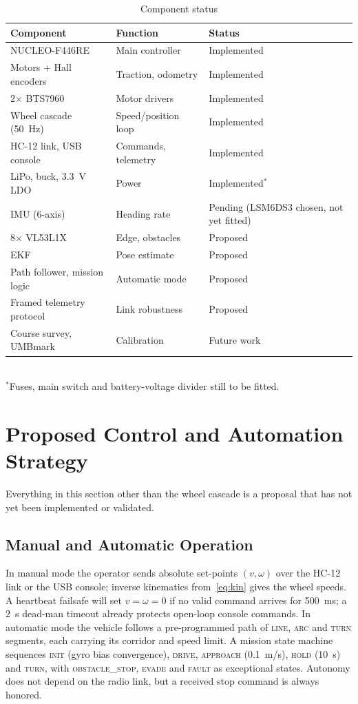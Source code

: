 \documentclass[conference]{IEEEtran}\newcommand{\haveieee}{}%
\begin{document}
\begin{table}[!t]
\caption{Component status}
\label{tab:status}
\centering\footnotesize
\setlength{\tabcolsep}{3pt}
\begin{tabular}{@{}p{3.1cm}p{2.7cm}p{1.5cm}@{}}
\toprule
\textbf{Component} & \textbf{Function} & \textbf{Status}\\
\midrule
NUCLEO-F446RE & Main controller & Implemented\\
Motors + Hall encoders & Traction, odometry & Implemented\\
2$\times$ BTS7960 & Motor drivers & Implemented\\
Wheel cascade (50~Hz) & Speed/position loop & Implemented\\
HC-12 link, USB console & Commands, telemetry & Implemented\\
LiPo, buck, 3.3~V LDO & Power & Implemented$^{*}$\\
IMU (6-axis) & Heading rate & Pending (LSM6DS3 chosen, not yet fitted)\\
8$\times$ VL53L1X & Edge, obstacles & Proposed\\
EKF & Pose estimate & Proposed\\
Path follower, mission logic & Automatic mode & Proposed\\
Framed telemetry protocol & Link robustness & Proposed\\
Course survey, UMBmark & Calibration & Future work\\
\bottomrule
\end{tabular}\\[1pt]
{\scriptsize $^{*}$Fuses, main switch and battery-voltage divider still to be fitted.}
\end{table}

\section{Proposed Control and Automation Strategy}
Everything in this section other than the wheel cascade is a proposal that has not yet been implemented or validated.

\subsection{Manual and Automatic Operation}
In manual mode the operator sends absolute set-points $(v,\omega)$ over the HC-12 link or the USB console; inverse kinematics from~\eqref{eq:kin} gives the wheel speeds. A heartbeat failsafe will set $v=\omega=0$ if no valid command arrives for 500~ms; a 2~s dead-man timeout already protects open-loop console commands. In automatic mode the vehicle follows a pre-programmed path of \textsc{line}, \textsc{arc} and \textsc{turn} segments, each carrying its corridor and speed limit. A mission state machine sequences \textsc{init} (gyro bias convergence), \textsc{drive}, \textsc{approach} (0.1~m/s), \textsc{hold} (10~s) and \textsc{turn}, with \textsc{obstacle\_stop}, \textsc{evade} and \textsc{fault} as exceptional states. Autonomy does not depend on the radio link, but a received stop command is always honored.
\end{document}
